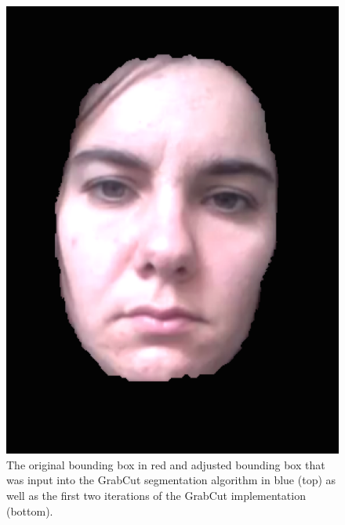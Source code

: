 \documentclass[10pt,twocolumn,letterpaper]{article}
\begin{document}
\begin{figure}
\begin{center}
	\includegraphics[scale=0.25]{figures/my_seg_it2}
\end{center}
\caption{The original bounding box in red and adjusted bounding box that was input into the GrabCut segmentation algorithm in blue (top) as well as the first two iterations of the GrabCut implementation (bottom).}
\label{segment}
\end{figure}
\end{document}
